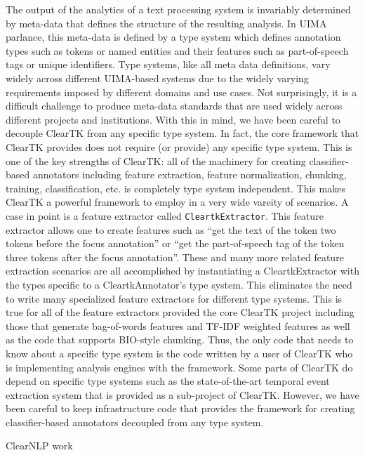 \documentclass[10pt, a4paper]{article}
\newcommand{\code}[1]{\texttt{\small #1}}
\begin{document}
The output of the analytics of a text processing system is invariably determined by meta-data that defines the structure of the resulting analysis.  In UIMA parlance, this meta-data is defined by a type system which defines annotation types such as tokens or named entities and their features such as part-of-speech tags or unique identifiers.  Type systems, like all meta data definitions, vary widely across different UIMA-based systems due to the widely varying requirements imposed by different domains and use cases.  Not surprisingly, it is a difficult challenge to produce meta-data standards that are used widely across different projects and institutions.  With this in mind, we have been careful to decouple ClearTK from any specific type system.  In fact, the core framework that ClearTK provides does not require (or provide) any specific type system.  This is one of the key strengths of ClearTK: all of the machinery for creating classifier-based annotators including feature extraction, feature normalization, chunking, training, classification, etc. is completely type system independent.  This makes ClearTK a powerful framework to employ in a very wide vareity of scenarios.  A case in point is a feature extractor called \code{CleartkExtractor}.  This feature extractor allows one to create features such as ``get the text of the token two tokens before the focus annotation'' or ``get the part-of-speech tag of the token three tokens after the focus annotation''.  These and many more related feature extraction scenarios are all accomplished by instantiating a CleartkExtractor with the types specific to a CleartkAnnotator's type system.  This eliminates the need to write many specialized feature extractors for different type systems.  This is true for all of the feature extractors provided the core ClearTK project including those that generate bag-of-words features and TF-IDF weighted features as well as the code that supports BIO-style chunking.  Thus, the only code that needs to know about a specific type system is the code written by a user of ClearTK who is implementing analysis engines with the framework.  Some parts of ClearTK do depend on specific type systems such as the state-of-the-art temporal event extraction system that is provided as a sub-project of ClearTK.  However, we have been careful to keep infrastructure code that provides the framework for creating classifier-based annotators decoupled from any type system.  




ClearNLP work
\end{document}
